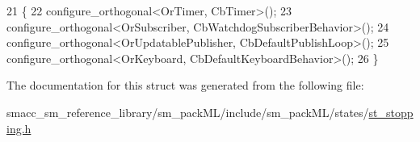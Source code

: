 \begin{DoxyCode}
21     \{
22         configure\_orthogonal<OrTimer, CbTimer>();   
23         configure\_orthogonal<OrSubscriber, CbWatchdogSubscriberBehavior>();
24         configure\_orthogonal<OrUpdatablePublisher, CbDefaultPublishLoop>();
25         configure\_orthogonal<OrKeyboard, CbDefaultKeyboardBehavior>();
26     \}
\end{DoxyCode}


The documentation for this struct was generated from the following file\+:\begin{DoxyCompactItemize}
\item 
smacc\+\_\+sm\+\_\+reference\+\_\+library/sm\+\_\+pack\+M\+L/include/sm\+\_\+pack\+M\+L/states/\hyperlink{st__stopping_8h}{st\+\_\+stopping.\+h}\end{DoxyCompactItemize}
